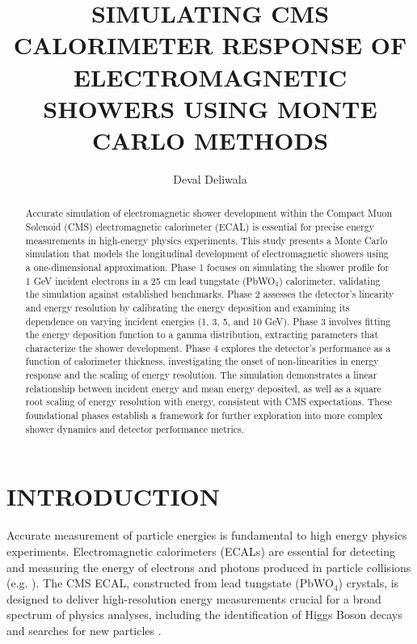 \documentclass[twocolumn]{aastex631}
\begin{document}
\title{SIMULATING CMS CALORIMETER RESPONSE OF ELECTROMAGNETIC SHOWERS USING
MONTE CARLO METHODS}

\author{Deval Deliwala}


\begin{abstract}
Accurate simulation of electromagnetic shower development within the Compact
Muon Solenoid (CMS) electromagnetic calorimeter (ECAL) is essential for precise
energy measurements in high-energy physics experiments. This study presents a
Monte Carlo simulation that models the longitudinal development of
electromagnetic showers using a one-dimensional approximation. Phase 1 focuses
on simulating the shower profile for 1 GeV incident electrons in a 25 cm lead
tungstate (PbWO\(_4\)) calorimeter, validating the simulation against
established benchmarks. Phase 2 assesses the detector's linearity and energy
resolution by calibrating the energy deposition and examining its dependence on
varying incident energies (1, 3, 5, and 10 GeV). Phase 3 involves fitting the
energy deposition function to a gamma distribution, extracting parameters that
characterize the shower development. Phase 4 explores the detector's performance
as a function of calorimeter thickness, investigating the onset of
non-linearities in energy response and the scaling of energy resolution. The
simulation demonstrates a linear relationship between incident energy and mean
energy deposited, as well as a square root scaling of energy resolution with
energy, consistent with CMS expectations. These foundational phases establish a
framework for further exploration into more complex shower dynamics and detector
performance metrics.
\end{abstract}

\section{INTRODUCTION}
Accurate measurement of particle energies is fundamental to high energy physics
experiments. Electromagnetic calorimeters (ECALs) are essential for detecting
and measuring the energy of electrons and photons produced in particle
collisions (e.g. \cite{PDG2022}). The CMS ECAL, constructed from lead tungstate
(PbWO$_\text{4}$) crystals, is designed to deliver high-resolution energy measurements
crucial for a broad spectrum of physics analyses, including the identification
of Higgs Boson decays and searches for new particles \citep{Brown2007}.
\end{document}
